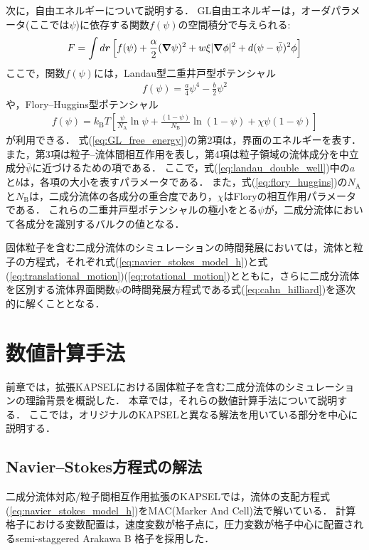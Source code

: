 \documentclass[pdflatex,a4paper,10pt,ja=standard]{bxjsarticle}
\def\vec#1{\mbox{\boldmath $#1$}}
\begin{document}
次に，自由エネルギーについて説明する．
GL自由エネルギーは，オーダパラメータ(ここでは$\psi$)に依存する関数$f(\psi)$の空間積分で与えられる:
\begin{align}
    F = \int d \vec{r} \left[f(\psi) + \frac{\alpha}{2} (\vec{\nabla} \psi)^{2} + w \xi |\vec{\nabla}\phi|^{2} + d (\psi - \bar{\psi})^{2} \phi\right]
    \label{eq:GL_free_energy}
\end{align}
ここで，関数$f(\psi)$には，Landau型二重井戸型ポテンシャル
\begin{align}
    f(\psi) = \frac{a}{4} \psi^{4} - \frac{b}{2} \psi^{2}
    \label{eq:landau_double_well}
\end{align}
や，Flory--Huggins型ポテンシャル
\begin{align}
    f(\psi) = k_{\mathrm B} T \left[ \frac{\psi}{N_{\mathrm A}} \ln{\psi} + \frac{(1-\psi)}{N_{\mathrm B}} \ln(1-\psi) + \chi \psi (1-\psi)\right]
    \label{eq:flory_huggins}
\end{align}
が利用できる．
式(\ref{eq:GL_free_energy})の第2項は，界面のエネルギーを表す．
また，第3項は粒子--流体間相互作用を表し，第4項は粒子領域の流体成分を中立成分$\bar{\psi}$に近づけるための項である．
ここで，式(\ref{eq:landau_double_well})中の$a$と$b$は，各項の大小を表すパラメータである．
また，式(\ref{eq:flory_huggins})の$N_{\mathrm A}$と$N_{\mathrm B}$は，二成分流体の各成分の重合度であり，$\chi$はFloryの相互作用パラメータである．
これらの二重井戸型ポテンシャルの極小をとる$\psi$が，二成分流体において各成分を識別するバルクの値となる．

固体粒子を含む二成分流体のシミュレーションの時間発展においては，流体と粒子の方程式，それぞれ式(\ref{eq:navier_stokes_model_h})と式(\ref{eq:translational_motion})(\ref{eq:rotational_motion})とともに，さらに二成分流体を区別する流体界面関数$\psi$の時間発展方程式である式(\ref{eq:cahn_hilliard})を逐次的に解くこととなる．

\section{数値計算手法}
前章では，拡張KAPSELにおける固体粒子を含む二成分流体のシミュレーションの理論背景を概説した．
本章では，それらの数値計算手法について説明する．
ここでは，オリジナルのKAPSELと異なる解法を用いている部分を中心に説明する．

\subsection{Navier--Stokes方程式の解法}
\label{sec:navier_stokes_solver}
二成分流体対応/粒子間相互作用拡張のKAPSELでは，流体の支配方程式(\ref{eq:navier_stokes_model_h})をMAC(Marker And Cell)法\autocite{harlow1965numerical}で解いている．
計算格子における変数配置は，速度変数が格子点に，圧力変数が格子中心に配置されるsemi-staggered Arakawa B 格子を採用した\autocite{arakawa1977computational}．
\end{document}
